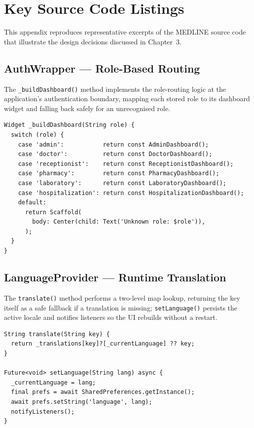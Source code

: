 \documentclass[12pt,a4paper,oneside]{report}
\begin{document}
\appendix
\chapter{Key Source Code Listings}
\label{app:code}

This appendix reproduces representative excerpts of the MEDLINE source code that
illustrate the design decisions discussed in Chapter~3.

\section{AuthWrapper --- Role-Based Routing}

The \texttt{\_buildDashboard()} method implements the role-routing logic at the
application's authentication boundary, mapping each stored role to its dashboard
widget and falling back safely for an unrecognised role.

\begin{lstlisting}[caption={\texttt{\_buildDashboard()} role-to-widget dispatch
  in \texttt{auth\_wrapper.dart}.},label={lst:builddashboard}]
Widget _buildDashboard(String role) {
  switch (role) {
    case 'admin':           return const AdminDashboard();
    case 'doctor':          return const DoctorDashboard();
    case 'receptionist':    return const ReceptionistDashboard();
    case 'pharmacy':        return const PharmacyDashboard();
    case 'laboratory':      return const LaboratoryDashboard();
    case 'hospitalization': return const HospitalizationDashboard();
    default:
      return Scaffold(
        body: Center(child: Text('Unknown role: $role')),
      );
  }
}
\end{lstlisting}

\section{LanguageProvider --- Runtime Translation}

The \texttt{translate()} method performs a two-level map lookup, returning the
key itself as a safe fallback if a translation is missing;
\texttt{setLanguage()} persists the active locale and notifies listeners so the
UI rebuilds without a restart.

\begin{lstlisting}[caption={Runtime translation and locale persistence in
  \texttt{language\_provider.dart}.},label={lst:translate}]
String translate(String key) {
  return _translations[key]?[_currentLanguage] ?? key;
}

Future<void> setLanguage(String lang) async {
  _currentLanguage = lang;
  final prefs = await SharedPreferences.getInstance();
  await prefs.setString('language', lang);
  notifyListeners();
}
\end{lstlisting}
\end{document}
